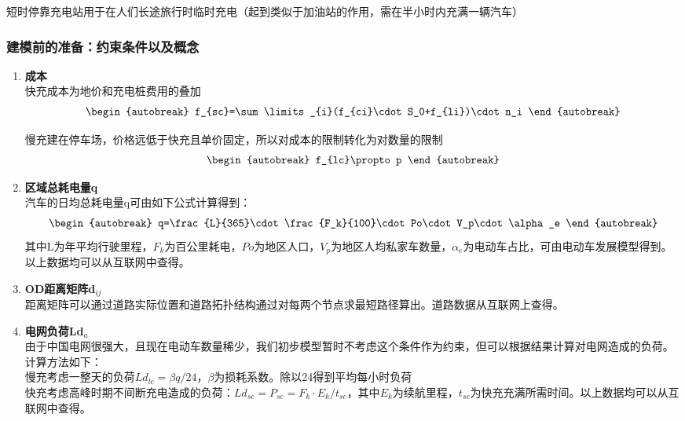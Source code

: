 \documentclass[12pt, a4paper, oneside]{ctexart}
\begin{document}
短时停靠充电站用于在人们长途旅行时临时充电（起到类似于加油站的作用，需在半小时内充满一辆汽车）
\subsubsection{建模前的准备：约束条件以及概念}
\begin{enumerate}[label = \roman*)]
    \item \textbf{成本}\\
          快充成本为地价和充电桩费用的叠加
          \begin{align}\begin{autobreak}
                  f_{sc}=\sum\limits_{i}(f_{ci}\cdot S_0+f_{li})\cdot n_i
              \end{autobreak}\end{align}



          慢充建在停车场，价格远低于快充且单价固定，所以对成本的限制转化为对数量的限制
          \begin{align}\begin{autobreak}
                  f_{lc}\propto p
              \end{autobreak}\end{align}
    \item \textbf{区域总耗电量q}\\
          汽车的日均总耗电量q可由如下公式计算得到：
          \begin{align}\begin{autobreak}
                  q=\frac{L}{365}\cdot \frac{F_k}{100}\cdot Po\cdot V_p\cdot \alpha_e
              \end{autobreak}\end{align}
          其中L为年平均行驶里程，\(F_k\)为百公里耗电，\(Po\)为地区人口，\(V_p\)为地区人均私家车数量，\(\alpha_e\)为电动车占比，可由电动车发展模型得到。以上数据均可以从互联网中查得。
    \item \textbf{OD距离矩阵d\(_{ij}\)}\\
          距离矩阵可以通过道路实际位置和道路拓扑结构通过对每两个节点求最短路径算出。道路数据从互联网上查得。
    \item \textbf{电网负荷Ld\(_a\)}\\
          由于中国电网很强大，且现在电动车数量稀少，我们初步模型暂时不考虑这个条件作为约束，但可以根据结果计算对电网造成的负荷。计算方法如下：\\
          慢充考虑一整天的负荷\(Ld_{lc}=\beta q/24\)，\(\beta\)为损耗系数。除以24得到平均每小时负荷\\
          快充考虑高峰时期不间断充电造成的负荷：\(Ld_{sc}=P_{sc}=F_k\cdot E_k/t_{sc}\)，其中\(E_k\)为续航里程，\(t_{sc}\)为快充充满所需时间。以上数据均可以从互联网中查得。


\end{enumerate}
\end{document}
